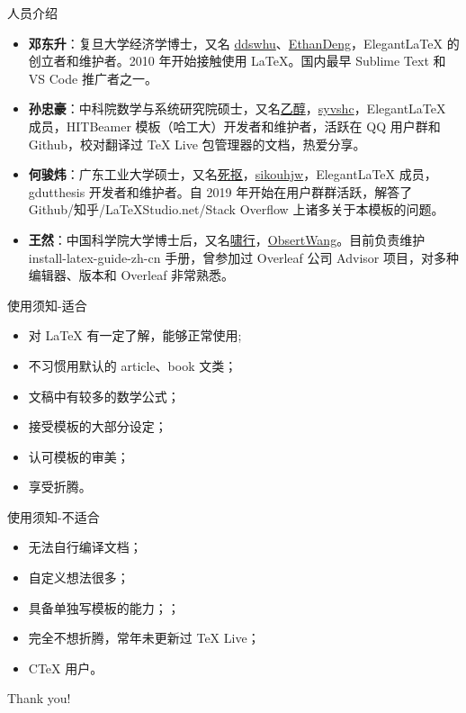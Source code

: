 \documentclass[9pt]{beamer}
\begin{document}
\begin{frame}{人员介绍}
  \begin{itemize}
    \item \textcolor{iron}{\bfseries 邓东升}：复旦大学经济学博士，又名 \underline{ddswhu}、\underline{EthanDeng}，Elegant\LaTeX{} 的创立者和维护者。2010 年开始接触使用 \LaTeX{}。国内最早 Sublime Text 和 VS Code 推广者之一。\\[2ex]
    \item \textcolor{iron}{\bfseries 孙忠豪}：中科院数学与系统研究院硕士，又名\underline{乙醇}，\underline{syvshc}，Elegant\LaTeX{} 成员，HITBeamer 模板（哈工大）开发者和维护者，活跃在 QQ 用户群和 Github，校对翻译过 \TeX{} Live 包管理器的文档，热爱分享。\\[2ex]
    \item \textcolor{iron}{\bfseries 何骏炜}：广东工业大学硕士，又名\underline{死抠}，\underline{sikouhjw}，Elegant\LaTeX{} 成员，gdutthesis 开发者和维护者。自 2019 年开始在用户群群活跃，解答了 Github/知乎/LaTeXStudio.net/Stack Overflow 上诸多关于本模板的问题。\\[2ex]
    \item \textcolor{iron}{\bfseries 王然}：中国科学院大学博士后，又名\underline{啸行}，\underline{ObsertWang}。目前负责维护 install-latex-guide-zh-cn 手册，曾参加过 Overleaf 公司 Advisor 项目，对多种编辑器、版本和 Overleaf 非常熟悉。
  \end{itemize}
\end{frame}


\begin{frame}{使用须知-适合}
  \begin{itemize}
    \item 对 \LaTeX{} 有一定了解，能够正常使用;
    \item 不习惯用默认的 article、book 文类；
    \item 文稿中有较多的数学公式；
    \item 接受模板的大部分设定；
    \item 认可模板的审美；
    \item 享受折腾。
  \end{itemize}  
\end{frame}


\begin{frame}{使用须知-不适合}
  \begin{itemize}
    \item 无法自行编译文档；
    \item 自定义想法很多；
    \item 具备单独写模板的能力；；
    \item 完全不想折腾，常年未更新过 TeX Live；
    \item CTeX 用户。
  \end{itemize}  
\end{frame}




\begin{frame}[standout]
  Thank you!
\end{frame}
\end{document}

